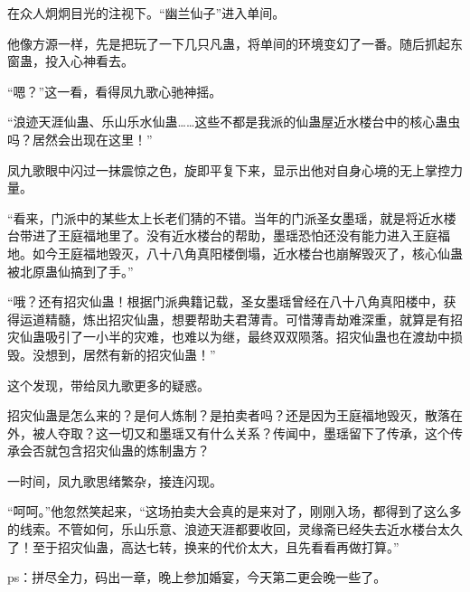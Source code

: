 \begin{this_body}
在众人炯炯目光的注视下。“幽兰仙子”进入单间。

他像方源一样，先是把玩了一下几只凡蛊，将单间的环境变幻了一番。随后抓起东窗蛊，投入心神看去。

“嗯？”这一看，看得凤九歌心驰神摇。

“浪迹天涯仙蛊、乐山乐水仙蛊……这些不都是我派的仙蛊屋近水楼台中的核心蛊虫吗？居然会出现在这里！”

凤九歌眼中闪过一抹震惊之色，旋即平复下来，显示出他对自身心境的无上掌控力量。

“看来，门派中的某些太上长老们猜的不错。当年的门派圣女墨瑶，就是将近水楼台带进了王庭福地里了。没有近水楼台的帮助，墨瑶恐怕还没有能力进入王庭福地。如今王庭福地毁灭，八十八角真阳楼倒塌，近水楼台也崩解毁灭了，核心仙蛊被北原蛊仙搞到了手。”

“哦？还有招灾仙蛊！根据门派典籍记载，圣女墨瑶曾经在八十八角真阳楼中，获得运道精髓，炼出招灾仙蛊，想要帮助夫君薄青。可惜薄青劫难深重，就算是有招灾仙蛊吸引了一小半的灾难，也难以为继，最终双双陨落。招灾仙蛊也在渡劫中损毁。没想到，居然有新的招灾仙蛊！”

这个发现，带给凤九歌更多的疑惑。

招灾仙蛊是怎么来的？是何人炼制？是拍卖者吗？还是因为王庭福地毁灭，散落在外，被人夺取？这一切又和墨瑶又有什么关系？传闻中，墨瑶留下了传承，这个传承会否就包含招灾仙蛊的炼制蛊方？

一时间，凤九歌思绪繁杂，接连闪现。

“呵呵。”他忽然笑起来，“这场拍卖大会真的是来对了，刚刚入场，都得到了这么多的线索。不管如何，乐山乐意、浪迹天涯都要收回，灵缘斋已经失去近水楼台太久了！至于招灾仙蛊，高达七转，换来的代价太大，且先看看再做打算。”

ps：拼尽全力，码出一章，晚上参加婚宴，今天第二更会晚一些了。

\end{this_body}

